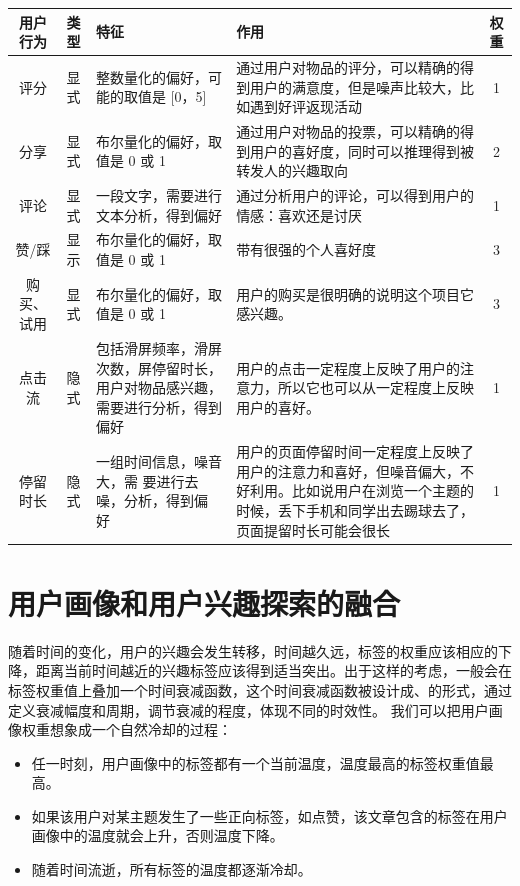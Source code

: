     \begin{table}[htp]
    \centering
    \label{tab:userAction}
    \begin{tabular}{ |c|c|p{4cm}|p{5cm}|c|} \hline
     用户行为 & 类型 & 特征 & 作用 & 权重\\ \hline
     评分 & 显式 & 整数量化的偏好，可能的取值是 [0，5] & 通过用户对物品的评分，可以精确的得到用户的满意度，但是噪声比较大，比如遇到好评返现活动 & 1\\ \hline
     分享 & 显式 & 布尔量化的偏好，取值是 0 或 1 & 通过用户对物品的投票，可以精确的得到用户的喜好度，同时可以推理得到被转发人的兴趣取向 & 2\\ \hline
     评论 & 显式 & 一段文字，需要进行文本分析，得到偏好 & 通过分析用户的评论，可以得到用户的情感：喜欢还是讨厌 & 1\\ \hline
     赞/踩 & 显示 & 布尔量化的偏好，取值是 0 或 1 & 带有很强的个人喜好度 & 3 \\ \hline
     购买、试用 & 显式 & 布尔量化的偏好，取值是 0 或 1 & 用户的购买是很明确的说明这个项目它感兴趣。& 3 \\ \hline
     点击流 & 隐式 & 包括滑屏频率，滑屏次数，屏停留时长，用户对物品感兴趣，需要进行分析，得到偏好 & 用户的点击一定程度上反映了用户的注意力，所以它也可以从一定程度上反映用户的喜好。& 1 \\ \hline
     停留时长 & 隐式 & 一组时间信息，噪音大，需 要进行去噪，分析，得到偏 好 & 用户的页面停留时间一定程度上反映了用户的注意力和喜好，但噪音偏大，不好利用。比如说用户在浏览一个主题的时候，丢下手机和同学出去踢球去了，页面提留时长可能会很长 & 1 \\ \hline
    \end{tabular}
    \end{table}

  \section{用户画像和用户兴趣探索的融合}
  随着时间的变化，用户的兴趣会发生转移，时间越久远，标签的权重应该相应的下降，距离当前时间越近的兴趣标签应该得到适当突出。出于这样的考虑，一般会在标签权重值上叠加一个时间衰减函数，这个时间衰减函数被设计成、的形式，通过定义衰减幅度和周期，调节衰减的程度，体现不同的时效性。
  我们可以把用户画像权重想象成一个自然冷却的过程：
  \begin{itemize}
    \item 任一时刻，用户画像中的标签都有一个当前温度，温度最高的标签权重值最高。
    \item 如果该用户对某主题发生了一些正向标签，如点赞，该文章包含的标签在用户画像中的温度就会上升，否则温度下降。
    \item 随着时间流逝，所有标签的温度都逐渐冷却。
  \end{itemize}

